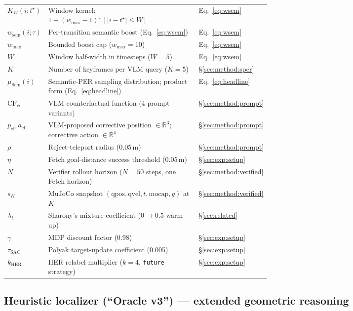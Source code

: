 \begin{table}[t]
\begin{tabular}{l p{0.62\linewidth} l}
$K_W(i;t^\star)$ & Window kernel; $1+(w_{\max}-1)\mathbb{1}[|i-t^\star|\le W]$ & Eq.~\eqref{eq:wsem} \\
$w_{\text{sem}}(i;\tau)$ & Per-transition semantic boost (Eq.~\ref{eq:wsem}) & Eq.~\eqref{eq:wsem} \\
$w_{\max}$ & Bounded boost cap ($w_{\max}=10$) & Eq.~\eqref{eq:wsem} \\
$W$ & Window half-width in timesteps ($W=5$) & Eq.~\eqref{eq:wsem} \\
$K$ & Number of keyframes per VLM query ($K=5$) & \S\ref{sec:method:sper} \\
$\mu_{\text{Sem}}(i)$ & Semantic-PER sampling distribution; product form (Eq.~\ref{eq:headline}) & Eq.~\eqref{eq:headline} \\
$\mathrm{CF}_\phi$ & VLM counterfactual function (4 prompt variants) & \S\ref{sec:method:prompt} \\
$p_{\text{cf}}, a_{\text{cf}}$ & VLM-proposed corrective position $\in\mathbb{R}^3$; corrective action $\in\mathbb{R}^4$ & \S\ref{sec:method:prompt} \\
$\rho$ & Reject-teleport radius (0.05\,m) & \S\ref{sec:method:prompt} \\
$\eta$ & Fetch goal-distance success threshold (0.05\,m) & \S\ref{sec:exp:setup} \\
$N$ & Verifier rollout horizon ($N\!=\!50$ steps, one Fetch horizon) & \S\ref{sec:method:verified} \\
$s_K$ & MuJoCo snapshot $(\text{qpos},\text{qvel},t,\text{mocap},g)$ at $K$ & \S\ref{sec:method:verified} \\
$\lambda_t$ & Sharony's mixture coefficient ($0\to 0.5$ warm-up) & \S\ref{sec:related} \\
$\gamma$ & MDP discount factor (0.98) & \S\ref{sec:exp:setup} \\
$\tau_{\text{SAC}}$ & Polyak target-update coefficient (0.005) & \S\ref{sec:exp:setup} \\
$k_{\text{HER}}$ & HER relabel multiplier ($k=4$, \texttt{future} strategy) & \S\ref{sec:exp:setup} \\
\bottomrule
\end{tabular}
\end{table}

\subsection{Heuristic localizer (``Oracle v3'') --- extended geometric reasoning}
\label{app:oracle-v3}

